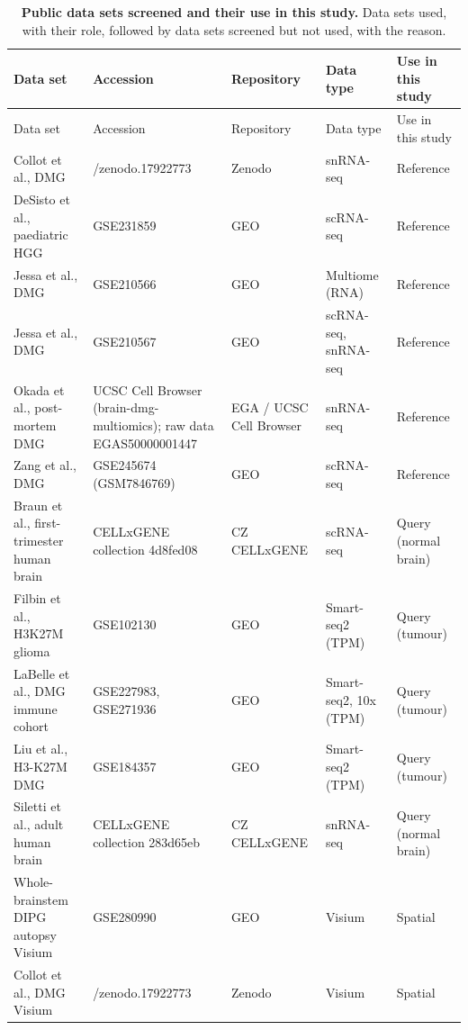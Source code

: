 \begin{landscape}
\footnotesize
\setlength{\tabcolsep}{4pt}\renewcommand{\arraystretch}{1.05}
\begin{longtable}{>{\raggedright\arraybackslash}p{6.2cm}>{\raggedright\arraybackslash}p{6.0cm}>{\raggedright\arraybackslash}p{3.2cm}>{\raggedright\arraybackslash}p{3.4cm}>{\raggedright\arraybackslash}p{4.6cm}}
\caption{\textbf{Public data sets screened and their use in this study.} Data sets used, with their role, followed by data
sets screened but not used, with the reason.}
\label{tab:deposits}\\
\toprule
Data set & Accession & Repository & Data type & Use in this study \\
\midrule
\endfirsthead
\toprule
Data set & Accession & Repository & Data type & Use in this study \\
\midrule
\endhead
Collot et al., DMG & 10.5281/zenodo.17922773 & Zenodo & snRNA-seq & Reference \\
DeSisto et al., paediatric HGG & GSE231859 & GEO & scRNA-seq & Reference \\
Jessa et al., DMG & GSE210566 & GEO & Multiome (RNA) & Reference \\
Jessa et al., DMG & GSE210567 & GEO & scRNA-seq, snRNA-seq & Reference \\
Okada et al., post-mortem DMG & UCSC Cell Browser (brain-dmg-multiomics); raw data EGAS50000001447 & EGA / UCSC Cell Browser & snRNA-seq & Reference \\
Zang et al., DMG & GSE245674 (GSM7846769) & GEO & scRNA-seq & Reference \\
Braun et al., first-trimester human brain & CELLxGENE collection 4d8fed08 & CZ CELLxGENE & scRNA-seq & Query (normal brain) \\
Filbin et al., H3K27M glioma & GSE102130 & GEO & Smart-seq2 (TPM) & Query (tumour) \\
LaBelle et al., DMG immune cohort & GSE227983, GSE271936 & GEO & Smart-seq2, 10x (TPM) & Query (tumour) \\
Liu et al., H3-K27M DMG & GSE184357 & GEO & Smart-seq2 (TPM) & Query (tumour) \\
Siletti et al., adult human brain & CELLxGENE collection 283d65eb & CZ CELLxGENE & snRNA-seq & Query (normal brain) \\
Whole-brainstem DIPG autopsy Visium & GSE280990 & GEO & Visium & Spatial \\
Collot et al., DMG Visium & 10.5281/zenodo.17922773 & Zenodo & Visium & Spatial \\

\end{longtable}
\end{landscape}
